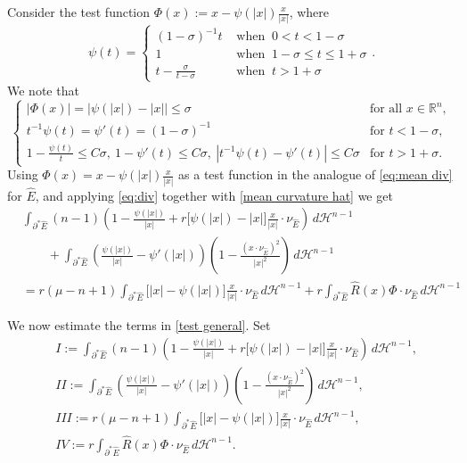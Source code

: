 \documentclass[reqno,11pt]{amsart}
\def\sz{\sigma}
\newcommand{\R}{\mathbb R}
\numberwithin{equation}{section}
\theoremstyle{remark}
\begin{document}
Consider the test function $\Phi(x) :=x-\psi(|x|)\frac{x}{|x|}$, where
$$\psi(t)=\left\{
\begin{array}{cl}
(1-\sz)^{-1} t& \text{ when } \ 0<t<1-\sz \\
1 &  \text{ when } \ 1-\sz\le t\le 1+\sz\\
t-\frac{\sz}{t-\sz} & \text{ when } \ t>1+\sz
\end{array}\right. .$$ 
We note that
\begin{equation}
\label{psi}
\left\{\begin{array}{cl}
|\Phi(x)|=\big|\psi(|x|)-|x|\big|\le \sz&\text{for all }x \in \R^n,\\
t^{-1}\psi(t)=\psi'(t)=(1-\sigma)^{-1}  &\text{for } t<1-\sz,\\
1-\frac{\psi(t)}{t}\le C\sz,\ 1-\psi'(t)\le C  \sz, \  \left|t^{-1}\psi(t)-\psi'(t)\right|\le C\sz  &
 \text{for }   t>1+\sigma.
\end{array}
\right.
\end{equation}
Using $\Phi(x)=x-\psi(|x|)\frac{x}{|x|}$ as a test function in the analogue of \eqref{eq:mean div} for $\hat E$, and applying \eqref{eq:div} together with \eqref{mean curvature hat} we get
\begin{equation}
\begin{split}
& \int_{\partial^* \hat E}  (n-1)\left(1-\frac{\psi(|x|)}{|x|}+r\big[\psi(|x|)-|x|\big]\frac{x}{|x|}\cdot \nu_{\hat E}\right)   \, d\mathscr H^{n-1} \\
&\qquad + \int_{\partial^* \hat E}\left(\frac{\psi(|x|)}{|x|} -  \psi'(|x|)\right)\left(1-\frac{(x\cdot \nu_{\hat E})^2}{|x|^2}\right)  \, d\mathscr H^{n-1} \\
&= r(\mu-n+1)  \int_{\partial^* \hat E}  \big[|x|-\psi(|x|)\big] \frac{x}{|x|}\cdot \nu_{\hat E} \, d\mathscr H^{n-1} +  r\int_{\partial^* \hat E} \hat R(x)  \Phi\cdot \nu_{\hat E} \,d\mathscr H^{n-1} \label{test general}
\end{split}
\end{equation}


We now estimate the terms in \eqref{test general}. Set
\begin{align*}
&I:=\int_{\partial^* \hat E}  (n-1)\left(1-\frac{\psi(|x|)}{|x|}+r\big[\psi(|x|)-|x|\big]\frac{x}{|x|}\cdot \nu_{\hat E}\right)   \, d\mathscr H^{n-1} ,\\
&II:=\int_{\partial^* \hat E}\left(\frac{\psi(|x|)}{|x|} -  \psi'(|x|)\right)\left(1-\frac{(x\cdot \nu_{\hat E})^2}{|x|^2}\right)  \, d\mathscr H^{n-1},\\
&III:=r(\mu-n+1)  \int_{\partial^* \hat E}  \big[|x|-\psi(|x|)\big] \frac{x}{|x|}\cdot \nu_{\hat E} \, d\mathscr H^{n-1}, \\
&IV:=r \int_{\partial^* \hat E} \hat R(x)  \Phi\cdot \nu_{\hat E} \,d\mathscr H^{n-1}.
\end{align*}
\end{document}
